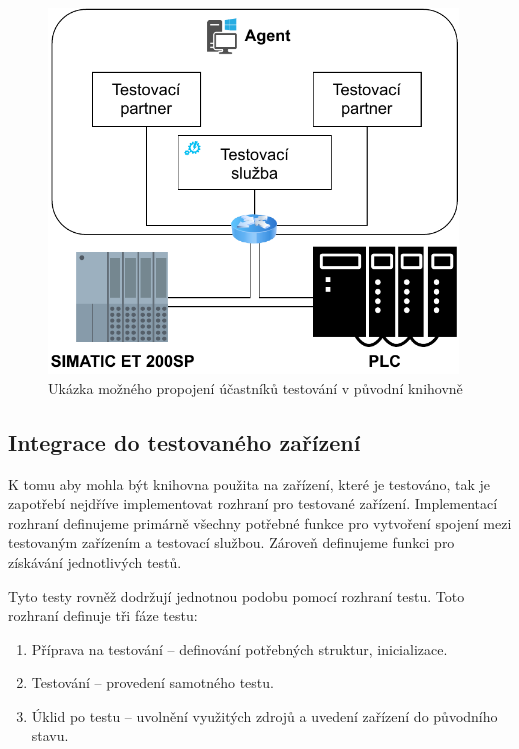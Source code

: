 \begin{figure}[htbp]
    \centering 
    \includegraphics[width=0.97\textwidth]{assets/img/bp_assets/devicemodel.pdf}
    \caption{Ukázka možného propojení účastníků testování v původní knihovně}
    \label{fig:bp_devicemodel}
\end{figure}


\subsection{Integrace do testovaného zařízení}

K tomu aby mohla být knihovna použita na zařízení, které je testováno, tak je zapotřebí nejdříve implementovat rozhraní pro testované zařízení. Implementací rozhraní definujeme primárně všechny potřebné funkce pro vytvoření spojení mezi testovaným zařízením a testovací službou. Zároveň definujeme funkci pro získávání jednotlivých testů. 

Tyto testy rovněž dodržují jednotnou podobu pomocí rozhraní testu. Toto rozhraní definuje tři fáze testu:

\begin{enumerate}
    \item Příprava na testování -- definování potřebných struktur, inicializace.
    \item Testování -- provedení samotného testu.
    \item Úklid po testu -- uvolnění využitých zdrojů a uvedení zařízení do původního stavu.
\end{enumerate}

